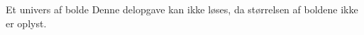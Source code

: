 \begin{opgave}{Et univers af bolde}
\opg Denne delopgave kan ikke løses, da størrelsen af boldene ikke er oplyst. %
\end{opgave}

